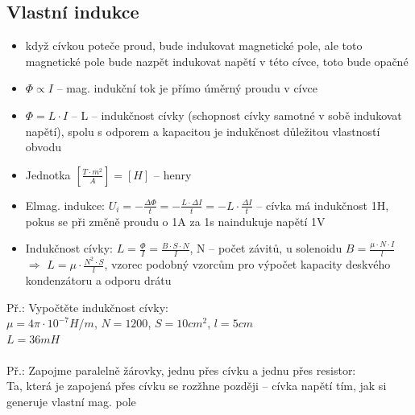 \documentclass{article}
\begin{document}
\subsection{Vlastní indukce}
\begin{itemize}
  \item když cívkou poteče proud, bude indukovat magnetické pole, ale toto magnetické pole bude nazpět indukovat napětí v této cívce, toto bude opačné
  \item $\Phi \propto I$ -- mag. indukční tok je přímo úměrný proudu v cívce
  \item $\Phi = L \cdot I$ -- L -- indukčnost cívky (schopnost cívky samotné v sobě indukovat napětí), spolu s odporem a kapacitou je indukčnost důležitou vlastností obvodu
  \item Jednotka $[\frac{T \cdot m^2}{A}] = [H]$ -- henry
  \item Elmag. indukce: $U_i = -\frac{\Delta \Phi}{t} = -\frac{L \cdot \Delta I}{t} = -L \cdot  \frac{\Delta I}{t}$ -- cívka má indukčnost 1H, pokus se při změně proudu o 1A za 1s naindukuje napětí 1V
  \item  Indukčnost cívky: $L= \frac{\Phi}{I}= \frac{B \cdot S \cdot N}{I}$, N -- počet závitů, u solenoidu $B=\frac{\mu \cdot N \cdot I}{l}$ $\Rightarrow$ $L= \mu \cdot \frac{N^2 \cdot S}{l}$, vzorec podobný vzorcům pro výpočet kapacity deskvého kondenzátoru a odporu drátu
\end{itemize}
Př.: Vypočtěte indukčnost cívky:\\
    $\mu = 4\pi \cdot 10^{-7} H/m$, $N = 1200$, $S= 10 cm^2$, $l = 5 cm$\\
    $L = 36 mH$\\\\
Př.: Zapojme paralelně žárovky, jednu přes cívku a jednu přes resistor:\\
    Ta, která je zapojená přes cívku se rozžhne později -- cívka  napětí tím, jak si generuje vlastní mag. pole\\
\end{document}
